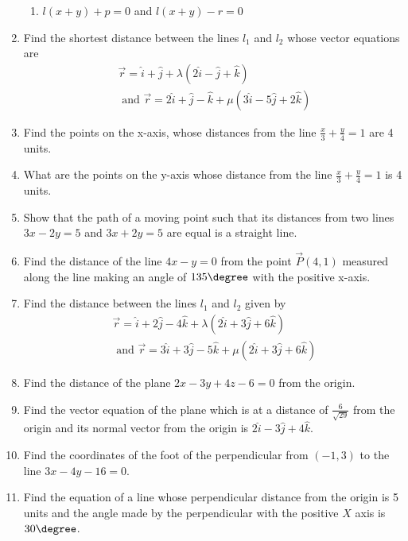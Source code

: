 \begin{enumerate}[label=\thesubsection.\arabic*, ref=\thesubsection.\theenumi]
\begin{enumerate}
	\item  $l(x+y)+p=0$ and  $l(x+y)-r=0$
\end{enumerate}
	\solution

\item Find the shortest distance between the lines $l_1$ and $l_2$ whose vector equations are
\begin{align}
\overrightarrow{r}= \hat{i}+ \hat{j}+ \lambda(2 \hat{i}- \hat{j}+ \hat{k}) \\
\text{ and } \overrightarrow{r}= 2 \hat{i}+ \hat{j}- \hat{k}+ \mu(3 \hat{i}- 5 \hat{j}+ 2 \hat{k}) 
\end{align}
\item Find the points on the x-axis,  whose distances from the line $\frac{x}{3}+\frac{y}{4}=1$ are 4 units.
\label{chapters/11/10/3/5}
	\\
	\solution

\item What are the points on the y-axis whose distance from the line $\frac{x}{3}+\frac{y}{4}=1$ is 4 units.
\\
\solution
		
\item Show that the path of a moving point such that its distances from two lines $3x-2y=5$ and $3x+2y=5$ are equal is a straight line.
\item Find the distance of the line $4x-y=0$ from the point $\vec{P}(4, 1)$ measured along the line making an angle of $135\degree$ with the positive x-axis.
\item Find the distance between the lines $l_1$ and $l_2$ given by
\begin{align}
\overrightarrow{r}= \hat{i}+ 2 \hat{j}- 4 \hat{k}+ \lambda(2 \hat{i}+ 3 \hat{j}+ 6 \hat{k}) \\
\text{ and }\overrightarrow{r}= 3 \hat{i}+ 3 \hat{j}- 5 \hat{k}+ \mu(2 \hat{i}+ 3 \hat{j}+ 6 \hat{k}) 
\end{align}
\item Find the distance of the plane $2x- 3y+ 4z- 6= 0$ from the origin.
\item Find the vector equation of the plane which is at a distance of $\frac{6}{\sqrt{29}}$ from the origin and its normal vector from the origin is $2 \hat{i}- 3 \hat{j}+ 4 \hat{k}$. 
\item Find the coordinates of the foot of the perpendicular from $(-1,  3)$ to the line $3x-4y-16=0$.  
\label{chapters/11/10/3/14}
\\
\solution

\item Find the equation of a line whose perpendicular distance from the origin is 5 units and the angle made by the perpendicular with the positive $X$ axis is $30\degree$.

\end{enumerate}
